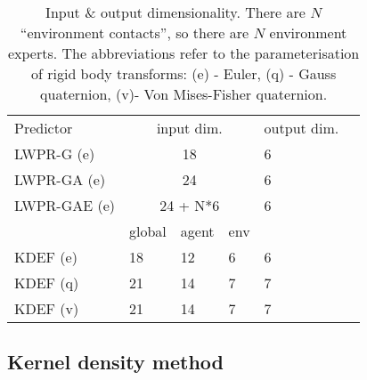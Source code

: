 \begin{table}[t]
\begin{center}
\begin{tabular}{|l|l|l|l|l|l|}
\cline{1-5}
Predictor & \multicolumn{3}{|c|}{input dim. } & output dim. \\ 
\cline{1-5} 
LWPR-G (e) & \multicolumn{3}{|c|}{18} & 6 \\
LWPR-GA (e) & \multicolumn{3}{|c|}{24} & 6 \\
LWPR-GAE (e) & \multicolumn{3}{|c|}{24 + N*6} & 6 \\
\cline{1-5}
\cline{2-4}
 & global & agent & env & \\
\cline{1-5}
KDEF (e) & 18 & 12 & 6 & 6 \\
KDEF (q) & 21 & 14 & 7 & 7 \\
KDEF (v) & 21 & 14 & 7 & 7 \\
\cline{1-5}
\end{tabular}
\caption[Input/output space]{Input \& output dimensionality. There are $N$ ``environment contacts'', so there are $N$ environment experts. The abbreviations refer to the parameterisation of rigid body transforms: (e) - Euler, (q) - Gauss quaternion, (v)- Von Mises-Fisher quaternion.}\label{tab:InpOutSpace}
\end{center}
\end{table}



\subsection{Kernel density method}\label{sec:Implementation.kde}

